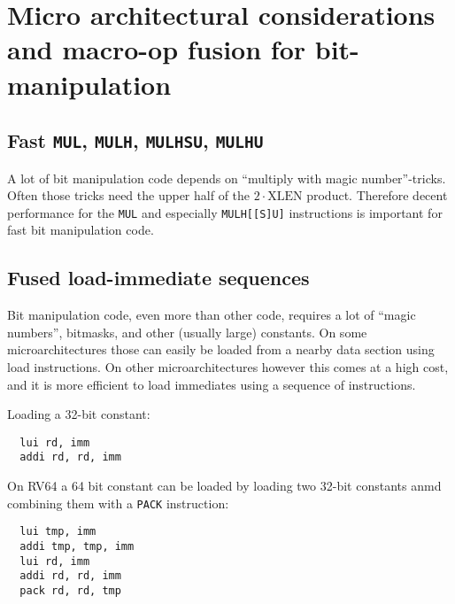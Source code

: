 \section{Micro architectural considerations and macro-op fusion for bit-manipulation}


\subsection{Fast {\tt MUL}, {\tt MULH}, {\tt MULHSU}, {\tt MULHU}}

A lot of bit manipulation code depends on ``multiply with magic number''-tricks. Often those
tricks need the upper half of the $2 \cdot \textrm{XLEN}$ product. Therefore decent performance
for the \texttt{MUL} and especially \texttt{MULH[[S]U]} instructions is important for fast
bit manipulation code.


\subsection{Fused load-immediate sequences}

Bit manipulation code, even more than other code, requires a lot of ``magic numbers'',
bitmasks, and other (usually large) constants. On some microarchitectures those
can easily be loaded from a nearby data section using load instructions. On other
microarchitectures however this comes at a high cost, and it is more efficient
to load immediates using a sequence of instructions.

Loading a 32-bit constant:

\begin{minipage}{\linewidth}
\begin{verbatim}
  lui rd, imm
  addi rd, rd, imm
\end{verbatim}
\end{minipage}

On RV64 a 64 bit constant can be loaded by loading two 32-bit constants anmd combining them
with a {\tt PACK} instruction:

\begin{minipage}{\linewidth}
\begin{verbatim}
  lui tmp, imm
  addi tmp, tmp, imm
  lui rd, imm
  addi rd, rd, imm
  pack rd, rd, tmp
\end{verbatim}
\end{minipage}

